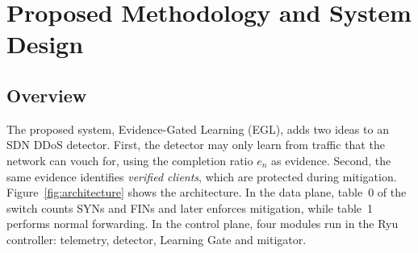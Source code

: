 \documentclass[12pt,a4paper,oneside]{report}
\begin{document}
\chapter{Proposed Methodology and System Design}
\section{Overview}
The proposed system, Evidence-Gated Learning (EGL), adds two ideas to an SDN DDoS detector. First, the detector may only learn from traffic that the network can vouch for, using the completion ratio $e_n$ as evidence. Second, the same evidence identifies \emph{verified clients}, which are protected during mitigation. Figure~\ref{fig:architecture} shows the architecture. In the data plane, table~0 of the switch counts SYNs and FINs and later enforces mitigation, while table~1 performs normal forwarding. In the control plane, four modules run in the Ryu controller: telemetry, detector, Learning Gate and mitigator.
\end{document}
